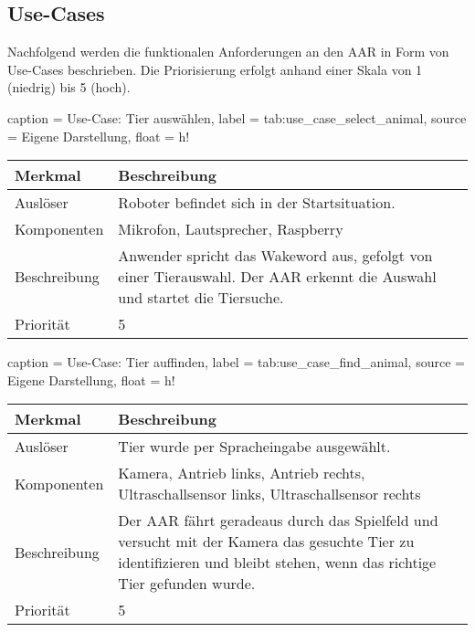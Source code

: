 \subsection{Use-Cases}\label{sec:use_cases}

Nachfolgend werden die funktionalen Anforderungen an den \ac{AAR} in Form von Use-Cases beschrieben.
Die Priorisierung erfolgt anhand einer Skala von 1 (niedrig) bis 5 (hoch).


\begin{dhbwtable}{%
    caption	= Use-Case: Tier auswählen,
    label	= tab:use_case_select_animal,
    source	= Eigene Darstellung,
    float = h!
}
    \begin{tabularx}{\textwidth}{lX}
        \toprule
        \textbf{Merkmal}     & \textbf{Beschreibung}  \\\midrule
        Auslöser     & Roboter befindet sich in der Startsituation.\\
        Komponenten  & Mikrofon, Lautsprecher, Raspberry\\
        Beschreibung & Anwender spricht das Wakeword aus, gefolgt von einer Tierauswahl. Der \ac{AAR} erkennt die Auswahl und startet die Tiersuche.\\
        Priorität    & 5 \\\bottomrule
    \end{tabularx}    
\end{dhbwtable}

\begin{dhbwtable}{%
    caption	= Use-Case: Tier auffinden,
    label	= tab:use_case_find_animal,
    source	= Eigene Darstellung,
    float = h!
}
    \begin{tabularx}{\textwidth}{lX}
        \toprule
        \textbf{Merkmal}     & \textbf{Beschreibung}  \\\midrule
        Auslöser     & Tier wurde per Spracheingabe ausgewählt.\\
        Komponenten  & Kamera, Antrieb links, Antrieb rechts, Ultraschallsensor links, Ultraschallsensor rechts\\
        Beschreibung & Der \ac{AAR} fährt geradeaus durch das Spielfeld und versucht mit der Kamera das gesuchte Tier zu identifizieren und bleibt stehen, wenn das richtige Tier gefunden wurde.\\
        Priorität    & 5 \\\bottomrule
    \end{tabularx}    
\end{dhbwtable}

